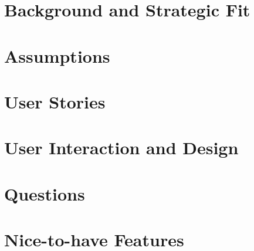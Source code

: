 \documentclass[a4paper,12pt]{article}
\begin{document}
\newpage
\section{Background and Strategic Fit} %

\newpage
\section{Assumptions} %

\newpage
\section{User Stories} %

\newpage
\section{User Interaction and Design} %

\newpage
\section{Questions} %

\newpage
\section{Nice-to-have Features} %
\end{document}
